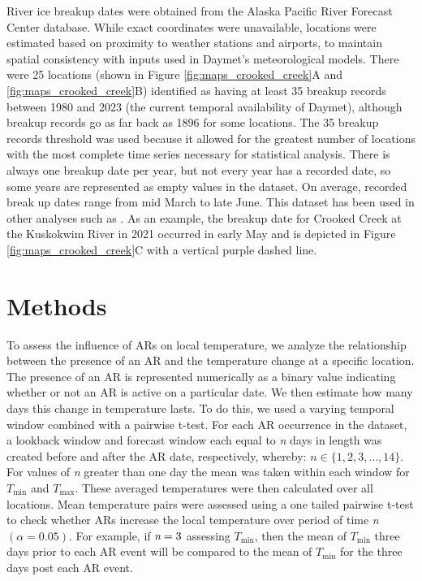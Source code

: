 \documentclass[12pts,draft]{AR_analysis_}
\begin{document}
River ice breakup dates 
were obtained from the Alaska Pacific River Forecast Center database.
While exact coordinates were unavailable, locations 
were estimated based on proximity to weather stations and airports, to 
maintain spatial consistency with inputs used in Daymet’s meteorological 
models. There were 25 locations (shown in Figure 
\ref{fig:maps_crooked_creek}A and \ref{fig:maps_crooked_creek}B) 
identified as having at least 35 breakup 
records between 1980 and 2023 (the current temporal availability of 
Daymet), although breakup records go as far back as 1896 for some 
locations. The 35 breakup records threshold was used because it 
allowed for the greatest 
number of locations with the most complete time series 
necessary for statistical analysis. There is always one breakup 
date per year, but not every year has a recorded date, so some 
years are represented as empty values in the dataset. On average, 
recorded break up dates range from mid March to late 
June. This dataset has been used in other analyses such as 
\cite{murphy2022, Brown2018, Bieniek2011}. As an example, 
the breakup date for Crooked Creek 
at the Kuskokwim River in 2021 occurred in early May and
is depicted in Figure 
\ref{fig:maps_crooked_creek}C with a 
vertical purple dashed line.



\section{Methods}

To assess the influence of ARs on local temperature, we analyze 
the relationship between the presence of an AR and the temperature 
change at a specific location. The presence of an AR is represented 
numerically as a binary value indicating whether or not an AR is 
active on a particular date. We then estimate how many days this 
change in temperature lasts. To do this, we used a
varying temporal window combined with a pairwise t-test. 
For each
AR occurrence in the dataset, a lookback window and forecast 
window each equal to \emph{n}
days in length was created before and after the AR date, respectively,
whereby: $ n \in \{1, 2, 3, \ldots, 14\}$.
For values of \emph{n} greater than one day the mean was 
taken within each window
for $T_{\text{min}}$ and $T_{\text{max}}$. These averaged 
temperatures were then
calculated over all locations. Mean temperature pairs 
were assessed using a one tailed pairwise t-test to check
whether ARs increase the local temperature over period of 
time \emph{n} $(\alpha =
0.05)$. For example, if $\emph{n} = 3$ assessing $T_{\text{min}}$,
then the mean of $T_{\text{min}}$ three days prior to each AR event
will be compared to the mean of $T_{\text{min}}$ for
the three days post each AR event.
\end{document}
